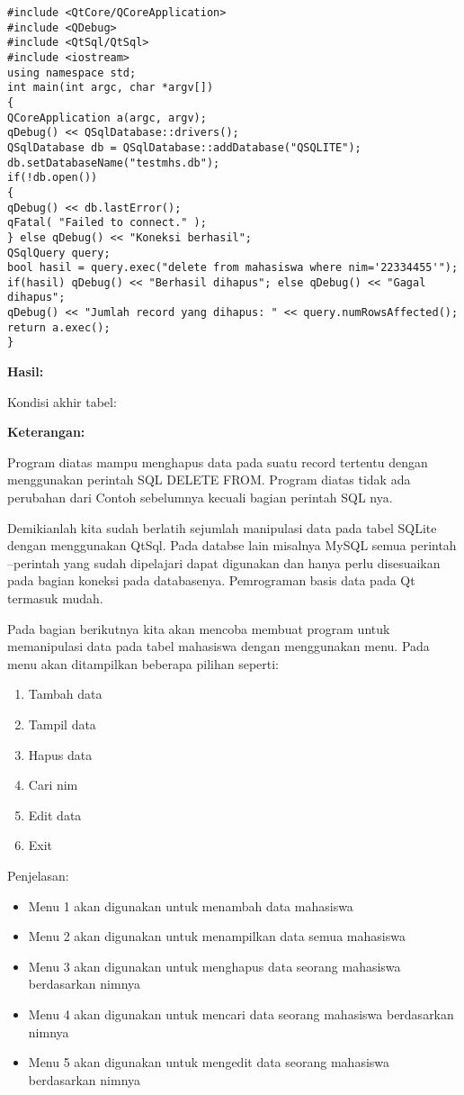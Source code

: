 \begin{verbatim}
#include <QtCore/QCoreApplication>
#include <QDebug>
#include <QtSql/QtSql>
#include <iostream>
using namespace std;
int main(int argc, char *argv[])
{
QCoreApplication a(argc, argv);
qDebug() << QSqlDatabase::drivers();
QSqlDatabase db = QSqlDatabase::addDatabase("QSQLITE");
db.setDatabaseName("testmhs.db");
if(!db.open())
{
qDebug() << db.lastError();
qFatal( "Failed to connect." );
} else qDebug() << "Koneksi berhasil";
QSqlQuery query;
bool hasil = query.exec("delete from mahasiswa where nim='22334455'");
if(hasil) qDebug() << "Berhasil dihapus"; else qDebug() << "Gagal dihapus";
qDebug() << "Jumlah record yang dihapus: " << query.numRowsAffected();
return a.exec();
}
\end{verbatim}

\textbf{Hasil:}

Kondisi akhir tabel:

\textbf{Keterangan:}

Program diatas mampu menghapus data pada suatu record tertentu dengan
menggunakan perintah SQL DELETE FROM. Program diatas tidak ada perubahan
dari Contoh sebelumnya kecuali bagian perintah SQL nya.

Demikianlah kita sudah berlatih sejumlah manipulasi data pada tabel
SQLite dengan menggunakan QtSql. Pada databse lain misalnya MySQL semua
perintah --perintah yang sudah dipelajari dapat digunakan dan hanya
perlu disesuaikan pada bagian koneksi pada databasenya. Pemrograman
basis data pada Qt termasuk mudah.

Pada bagian berikutnya kita akan mencoba membuat program untuk
memanipulasi data pada tabel mahasiswa dengan menggunakan menu. Pada
menu akan ditampilkan beberapa pilihan seperti:

\begin{enumerate}
\def\labelenumi{\arabic{enumi}.}
\tightlist
\item
  Tambah data
\item
  Tampil data
\item
  Hapus data
\item
  Cari nim
\item
  Edit data
\item
  Exit
\end{enumerate}

Penjelasan:

\begin{itemize}
\tightlist
\item
  Menu 1 akan digunakan untuk menambah data mahasiswa
\item
  Menu 2 akan digunakan untuk menampilkan data semua mahasiswa
\item
  Menu 3 akan digunakan untuk menghapus data seorang mahasiswa
  berdasarkan nimnya
\item
  Menu 4 akan digunakan untuk mencari data seorang mahasiswa berdasarkan
  nimnya
\item
  Menu 5 akan digunakan untuk mengedit data seorang mahasiswa
  berdasarkan nimnya
\end{itemize}


